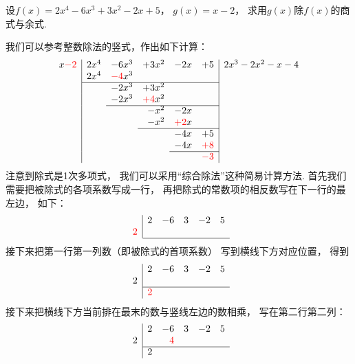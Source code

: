 \begin{example}
设\(f(x) = 2x^4-6x^3+3x^2-2x+5\)，
\(g(x) = x-2\)，
求用\(g(x)\)除\(f(x)\)的商式与余式.
\begin{solution}我们可以参考整数除法的竖式，作出如下计算：
\begin{equation*}
	\begin{array}{r|*5r|l}
		x{\color{red}-2} &
		2x^4 & -6x^3 & +3x^2 & -2x & +5
		& 2x^3-2x^2-x-4 \\
		& 2x^4 & {\color{red}-4}x^3 &&&& \\ \cline{2-6}
		&& -2x^3 & +3x^2 &&& \\
		&& -2x^3 & {\color{red}+4}x^2 &&& \\ \cline{3-6}
		&&& -x^2 & -2x && \\
		&&& -x^2 & {\color{red}+2}x && \\ \cline{4-6}
		&&&& -4x & +5 & \\
		&&&& -4x & {\color{red}+8} & \\ \cline{5-6}
		&&&&& {\color{red}-3}
	\end{array}
\end{equation*}
注意到除式是1次多项式，
我们可以采用“综合除法”这种简易计算方法.
首先我们需要把被除式的各项系数写成一行，
再把除式的常数项的相反数写在下一行的最左边，
如下：\begin{equation*}
	\begin{array}{r|*5r}
		& 2 & -6 & 3 & -2 & 5 \\
		{\color{red}2} \\ \cline{2-6}
	\end{array}
\end{equation*}
接下来把第一行第一列数（即被除式的首项系数）
写到横线下方对应位置，
得到\begin{equation*}
	\begin{array}{r|*5r}
		& 2 & -6 & 3 & -2 & 5 \\
		2 \\ \cline{2-6}
		& {\color{red}2}
	\end{array}
\end{equation*}
接下来把横线下方当前排在最末的数与竖线左边的数相乘，
写在第二行第二列：\begin{equation*}
	\begin{array}{r|*5r}
		& 2 & -6 & 3 & -2 & 5 \\
		2 && {\color{red}4} \\ \cline{2-6}
		& 2
	\end{array}
\end{equation*}

\end{solution}
\end{example}

